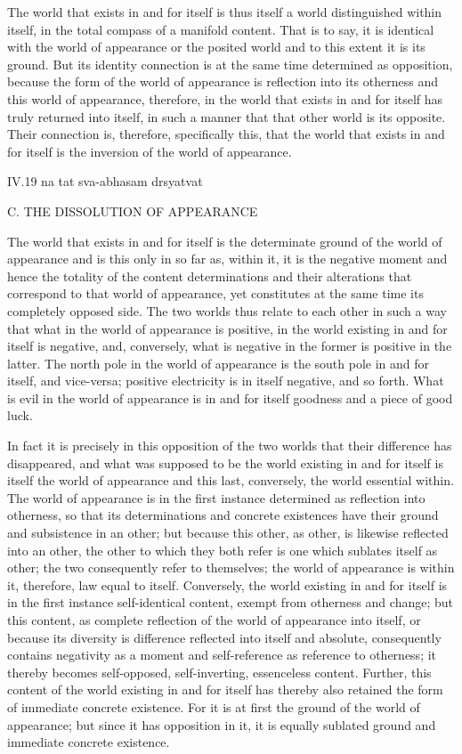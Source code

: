 The world that exists in and for itself is
thus itself a world distinguished within itself,
in the total compass of a manifold content.
That is to say, it is identical with the world of appearance
or the posited world and to this extent it is its ground.
But its identity connection is at the same time
determined as opposition,
because the form of the world of appearance is
reflection into its otherness
and this world of appearance, therefore, in the
world that exists in and for itself
has truly returned into itself,
in such a manner that
that other world is its opposite.
Their connection is, therefore, specifically this,
that the world that exists in and for itself is
the inversion of the world of appearance.

IV.19
na tat sva-abhasam drsyatvat

C. THE DISSOLUTION OF APPEARANCE

The world that exists in and for itself is
the determinate ground of the world of appearance
and is this only in so far as, within it,
it is the negative moment
and hence the totality of the content determinations
and their alterations that correspond to that world of appearance,
yet constitutes at the same time its completely opposed side.
The two worlds thus relate to each other in such a way
that what in the world of appearance is positive,
in the world existing in and for itself is negative,
and, conversely, what is negative in the former
is positive in the latter.
The north pole in the world of appearance
is the south pole in and for itself, and vice-versa;
positive electricity is in itself negative, and so forth.
What is evil in the world of appearance is
in and for itself goodness and a piece of good luck.

In fact it is precisely in this opposition
of the two worlds that their difference has disappeared,
and what was supposed to be
the world existing in and for itself is
itself the world of appearance
and this last, conversely,
the world essential within.
The world of appearance is in the first instance
determined as reflection into otherness,
so that its determinations and concrete existences have
their ground and subsistence in an other;
but because this other, as other,
is likewise reflected into an other,
the other to which they both refer is
one which sublates itself as other;
the two consequently refer to themselves;
the world of appearance is within it,
therefore, law equal to itself.
Conversely, the world existing in and for itself is
in the first instance self-identical content,
exempt from otherness and change;
but this content, as complete reflection of
the world of appearance into itself,
or because its diversity is difference
reflected into itself and absolute,
consequently contains negativity as a moment
and self-reference as reference to otherness;
it thereby becomes self-opposed, self-inverting, essenceless content.
Further, this content of the world existing in and for itself has
thereby also retained the form of immediate concrete existence.
For it is at first the ground of the world of appearance;
but since it has opposition in it, it is equally
sublated ground and immediate concrete existence.


